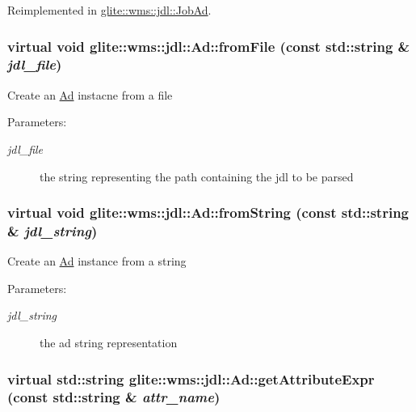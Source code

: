 Reimplemented in \hyperlink{classglite_1_1wms_1_1jdl_1_1JobAd_z9_2}{glite::wms::jdl::Job\-Ad}.\hypertarget{classglite_1_1wms_1_1jdl_1_1Ad_z13_1}{
\subsubsection[fromFile]{\setlength{\rightskip}{0pt plus 5cm}virtual void glite::wms::jdl::Ad::from\-File (const std::string \& {\em jdl\_\-file})}}
\label{classglite_1_1wms_1_1jdl_1_1Ad_z13_1}


Create an \hyperlink{classglite_1_1wms_1_1jdl_1_1Ad}{Ad} instacne from a file \begin{Desc}
\item[Parameters:]
\begin{description}
\item[{\em jdl\_\-file}]the string representing the path containing the jdl to be parsed \end{description}
\end{Desc}
\hypertarget{classglite_1_1wms_1_1jdl_1_1Ad_z13_0}{
\subsubsection[fromString]{\setlength{\rightskip}{0pt plus 5cm}virtual void glite::wms::jdl::Ad::from\-String (const std::string \& {\em jdl\_\-string})}}
\label{classglite_1_1wms_1_1jdl_1_1Ad_z13_0}


Create an \hyperlink{classglite_1_1wms_1_1jdl_1_1Ad}{Ad} instance from a string \begin{Desc}
\item[Parameters:]
\begin{description}
\item[{\em jdl\_\-string}]the ad string representation \end{description}
\end{Desc}
\hypertarget{classglite_1_1wms_1_1jdl_1_1Ad_z19_16}{
\subsubsection[getAttributeExpr]{\setlength{\rightskip}{0pt plus 5cm}virtual std::string glite::wms::jdl::Ad::get\-Attribute\-Expr (const std::string \& {\em attr\_\-name})}}
\label{classglite_1_1wms_1_1jdl_1_1Ad_z19_16}


